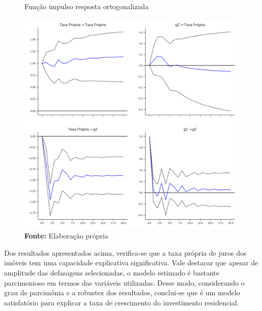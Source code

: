 \begin{figure}[H]
	\centering
	\caption{Função impulso resposta ortogonalizada}
	\label{irf}
	\includegraphics[width=\textwidth]{../../Modelo/SeriesTemporais/figs/Impulso_VECM.png}
	\caption*{\textbf{Fonte:} Elaboração própria}
\end{figure}

Dos resultados apresentados acima, verifica-se que a taxa própria de juros dos imóveis tem uma capacidade explicativa significativa. Vale destacar que apesar de amplitude das defasagens selecionadas, o modelo estimado é bastante parcimonioso em termos das variáveis utilizadas. Desse modo, considerando o grau de parcimônia e a robustez dos resultados, conclui-se que é um modelo satisfatório para explicar a taxa de crescimento do investimento residencial. 

